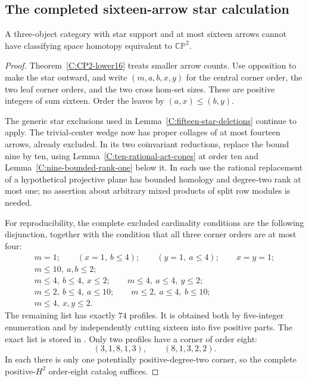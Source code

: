 \subsection{The completed sixteen-arrow star calculation}

\begin{theorem}\label{C:sixteen-all-stars}
A three-object category with star support and at most sixteen
arrows cannot have classifying space homotopy equivalent to
$\mathbb {CP}^2$.
\end{theorem}
\begin{proof}
Theorem~\ref{C:CP2-lower16} treats smaller arrow counts.
Use opposition to make the star outward, and write
$(m,a,b,x,y)$ for the central corner order, the two leaf
corner orders, and the two cross hom-set sizes.  These are
positive integers of sum sixteen.  Order the leaves by
$(a,x)\leq(b,y)$.

The generic star exclusions used in
Lemma~\ref{C:fifteen-star-deletions} continue to apply.
The trivial-center wedge now has proper collages of at most
fourteen arrows, already excluded.  In its two coinvariant
reductions, replace the bound nine by ten, using
Lemma~\ref{C:ten-rational-act-cones} at order ten and
Lemma~\ref{C:nine-bounded-rank-one} below it.  In each use
the rational replacement of a hypothetical projective plane
has bounded homology and degree-two rank at most one; no
assertion about arbitrary mixed products of split row modules
is needed.

For reproducibility, the complete excluded cardinality
conditions are the following disjunction, together with the
condition that all three corner orders are at most four:
\[
\begin{gathered}
 m=1;\qquad (x=1,\ b\leq4);\qquad(y=1,\ a\leq4);
 \qquad x=y=1;\\
 m\leq10,\ a,b\leq2;\\
 m\leq4,\ b\leq4,\ x\leq2;\qquad
 m\leq4,\ a\leq4,\ y\leq2;\\
 m\leq2,\ b\leq4,\ a\leq10;\qquad
 m\leq2,\ a\leq4,\ b\leq10;\\
 m\leq4,\ x,y\leq2.
\end{gathered}
\]
The remaining list has exactly $74$ profiles.  It is obtained
both by five-integer enumeration and by independently cutting
sixteen into five positive parts.  The exact list is stored in
.  Only two profiles have a
corner of order eight:
\[
 (3,1,8,1,3),\qquad (8,1,3,2,2).
\]
In each there is only one potentially positive-degree-two
corner, so the complete positive-$H^2$ order-eight catalog
suffices.


\end{proof}
